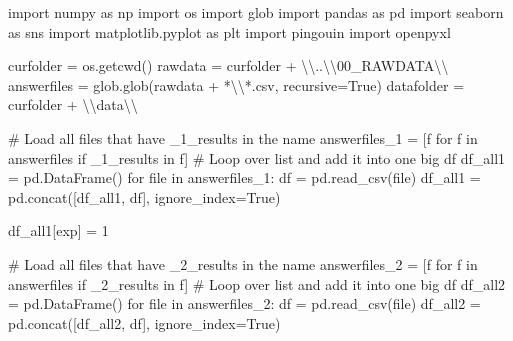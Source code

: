 \documentclass[
  letterpaper,
  DIV=11,
  numbers=noendperiod]{scrreprt}
\newenvironment{Shaded}{\begin{snugshade}}{\end{snugshade}}
\newcommand{\BuiltInTok}[1]{\textcolor[rgb]{0.00,0.23,0.31}{#1}}
\newcommand{\CharTok}[1]{\textcolor[rgb]{0.13,0.47,0.30}{#1}}
\newcommand{\CommentTok}[1]{\textcolor[rgb]{0.37,0.37,0.37}{#1}}
\newcommand{\ControlFlowTok}[1]{\textcolor[rgb]{0.00,0.23,0.31}{#1}}
\newcommand{\DecValTok}[1]{\textcolor[rgb]{0.68,0.00,0.00}{#1}}
\newcommand{\ImportTok}[1]{\textcolor[rgb]{0.00,0.46,0.62}{#1}}
\newcommand{\KeywordTok}[1]{\textcolor[rgb]{0.00,0.23,0.31}{#1}}
\newcommand{\NormalTok}[1]{\textcolor[rgb]{0.00,0.23,0.31}{#1}}
\newcommand{\OperatorTok}[1]{\textcolor[rgb]{0.37,0.37,0.37}{#1}}
\newcommand{\StringTok}[1]{\textcolor[rgb]{0.13,0.47,0.30}{#1}}
\newcommand{\VariableTok}[1]{\textcolor[rgb]{0.07,0.07,0.07}{#1}}
\begin{document}
\begin{Shaded}
\begin{Highlighting}[]
\ImportTok{import}\NormalTok{ numpy }\ImportTok{as}\NormalTok{ np}
\ImportTok{import}\NormalTok{ os}
\ImportTok{import}\NormalTok{ glob}
\ImportTok{import}\NormalTok{ pandas }\ImportTok{as}\NormalTok{ pd}
\ImportTok{import}\NormalTok{ seaborn }\ImportTok{as}\NormalTok{ sns}
\ImportTok{import}\NormalTok{ matplotlib.pyplot }\ImportTok{as}\NormalTok{ plt}
\ImportTok{import}\NormalTok{ pingouin}
\ImportTok{import}\NormalTok{ openpyxl}

\NormalTok{curfolder }\OperatorTok{=}\NormalTok{ os.getcwd()}
\NormalTok{rawdata }\OperatorTok{=}\NormalTok{ curfolder }\OperatorTok{+} \StringTok{\textquotesingle{}}\CharTok{\textbackslash{}\textbackslash{}}\StringTok{..}\CharTok{\textbackslash{}\textbackslash{}}\StringTok{00\_RAWDATA}\CharTok{\textbackslash{}\textbackslash{}}\StringTok{\textquotesingle{}}
\NormalTok{answerfiles }\OperatorTok{=}\NormalTok{ glob.glob(rawdata }\OperatorTok{+} \StringTok{\textquotesingle{}*}\CharTok{\textbackslash{}\textbackslash{}}\StringTok{*.csv\textquotesingle{}}\NormalTok{, recursive}\OperatorTok{=}\VariableTok{True}\NormalTok{)}
\NormalTok{datafolder }\OperatorTok{=}\NormalTok{ curfolder }\OperatorTok{+} \StringTok{\textquotesingle{}}\CharTok{\textbackslash{}\textbackslash{}}\StringTok{data}\CharTok{\textbackslash{}\textbackslash{}}\StringTok{\textquotesingle{}}

\CommentTok{\# Load all files that have \textquotesingle{}\_1\_results\textquotesingle{} in the name }
\NormalTok{answerfiles\_1 }\OperatorTok{=}\NormalTok{ [f }\ControlFlowTok{for}\NormalTok{ f }\KeywordTok{in}\NormalTok{ answerfiles }\ControlFlowTok{if} \StringTok{\textquotesingle{}\_1\_results\textquotesingle{}} \KeywordTok{in}\NormalTok{ f]}
\CommentTok{\# Loop over list and add it into one big df}
\NormalTok{df\_all1 }\OperatorTok{=}\NormalTok{ pd.DataFrame()}
\ControlFlowTok{for} \BuiltInTok{file} \KeywordTok{in}\NormalTok{ answerfiles\_1:}
\NormalTok{    df }\OperatorTok{=}\NormalTok{ pd.read\_csv(}\BuiltInTok{file}\NormalTok{)}
\NormalTok{    df\_all1 }\OperatorTok{=}\NormalTok{ pd.concat([df\_all1, df], ignore\_index}\OperatorTok{=}\VariableTok{True}\NormalTok{)}

\NormalTok{df\_all1[}\StringTok{\textquotesingle{}exp\textquotesingle{}}\NormalTok{] }\OperatorTok{=} \DecValTok{1} 

\CommentTok{\# Load all files that have \textquotesingle{}\_2\_results\textquotesingle{} in the name}
\NormalTok{answerfiles\_2 }\OperatorTok{=}\NormalTok{ [f }\ControlFlowTok{for}\NormalTok{ f }\KeywordTok{in}\NormalTok{ answerfiles }\ControlFlowTok{if} \StringTok{\textquotesingle{}\_2\_results\textquotesingle{}} \KeywordTok{in}\NormalTok{ f]}
\CommentTok{\# Loop over list and add it into one big df}
\NormalTok{df\_all2 }\OperatorTok{=}\NormalTok{ pd.DataFrame()}
\ControlFlowTok{for} \BuiltInTok{file} \KeywordTok{in}\NormalTok{ answerfiles\_2:}
\NormalTok{    df }\OperatorTok{=}\NormalTok{ pd.read\_csv(}\BuiltInTok{file}\NormalTok{)}
\NormalTok{    df\_all2 }\OperatorTok{=}\NormalTok{ pd.concat([df\_all2, df], ignore\_index}\OperatorTok{=}\VariableTok{True}\NormalTok{)}


\end{Highlighting}
\end{Shaded}
\end{document}
